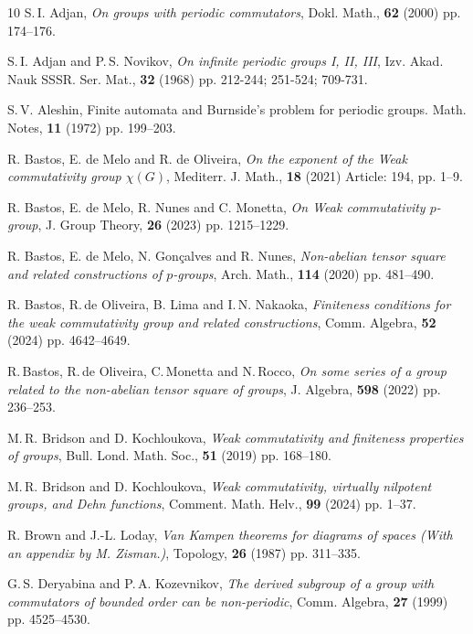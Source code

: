 \documentclass[12pt,leqno]{amsart}
\begin{document}
\begin{thebibliography}{10}
 S.\,I. Adjan, {\it On groups with periodic commutators}, Dokl. Math., {\bf 62} (2000) pp. 174–176.

 S.\,I. Adjan and P.\,S. Novikov, {\it On infinite periodic groups I, II, III}, Izv. Akad. Nauk SSSR. Ser. Mat., {\bf 32} (1968) pp. 212-244; 251-524; 709-731.

 S.\,V. Aleshin, Finite automata and Burnside's problem for periodic groups. Math. Notes, {\bf 11} (1972) pp. 199--203.

 R. Bastos, E. de Melo and R. de Oliveira, {\it On the exponent of the Weak commutativity group $\chi(G)$}, Mediterr. J. Math., {\bf 18} (2021) Article: 194, pp. 1--9. 

 R. Bastos, E. de Melo, R. Nunes and C. Monetta, {\it On Weak commutativity $p$-group}, J. Group Theory, {\bf 26} (2023) pp. 1215--1229.

 R. Bastos, E. de Melo, N. Gon\c calves and R. Nunes, {\it Non-abelian tensor square and related constructions of $p$-groups}, Arch. Math., {\bf 114} (2020) pp. 481--490. 

 R. Bastos, R.\,de Oliveira, B. Lima and I.\,N. Nakaoka, {\it Finiteness conditions for the weak commutativity group and related constructions}, Comm. Algebra, {\bf 52} (2024) pp. 4642--4649. 

 R.\,Bastos, R.\,de Oliveira, C.\,Monetta and N.\,Rocco, {\it On some series of a group related to the non-abelian tensor square of groups}, J. Algebra, {\bf 598} (2022) pp. 236--253.

 M.\,R. Bridson and D. Kochloukova, {\it Weak commutativity and finiteness properties of groups}, Bull. Lond. Math. Soc., {\bf 51} (2019) pp. 168--180. 

 M.\,R. Bridson and D. Kochloukova, {\it Weak commutativity, virtually nilpotent groups, and Dehn functions}, Comment. Math. Helv., {\bf 99} (2024) pp. 1--37. 

 R. Brown and J.-L. Loday, {\it Van Kampen theorems for diagrams of spaces (With an appendix by M. Zisman.)}, Topology, {\bf 26} (1987) pp. 311--335.

 G.\,S. Deryabina and P.\,A. Kozevnikov, {\it The derived subgroup of a group with commutators of bounded order can be non-periodic}, Comm. Algebra, {\bf 27} (1999) pp. 4525--4530. 


\end{thebibliography}
\end{document}

